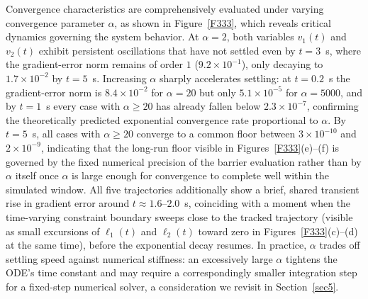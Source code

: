 \documentclass[pdflatex,sn-mathphys,Numbered]{sn-jnl}
\theoremstyle{thmstyleone}
\theoremstyle{thmstyletwo}
\theoremstyle{thmstylethree}
\begin{document}
Convergence characteristics are comprehensively evaluated under varying convergence parameter $\alpha$, as shown in Figure~\ref{F333}, which reveals critical dynamics governing the system behavior. At $\alpha=2$, both variables $v_1(t)$ and $v_2(t)$ exhibit persistent oscillations that have not settled even by $t=3$~s, where the gradient-error norm remains of order $1$ ($9.2\times10^{-1}$), only decaying to $1.7\times10^{-2}$ by $t=5$~s. Increasing $\alpha$ sharply accelerates settling: at $t=0.2$~s the gradient-error norm is $8.4\times10^{-2}$ for $\alpha=20$ but only $5.1\times10^{-5}$ for $\alpha=5000$, and by $t=1$~s every case with $\alpha\geq20$ has already fallen below $2.3\times10^{-7}$, confirming the theoretically predicted exponential convergence rate proportional to $\alpha$. By $t=5$~s, all cases with $\alpha\geq20$ converge to a common floor between $3\times10^{-10}$ and $2\times10^{-9}$, indicating that the long-run floor visible in Figures~\ref{F333}(e)--(f) is governed by the fixed numerical precision of the barrier evaluation rather than by $\alpha$ itself once $\alpha$ is large enough for convergence to complete well within the simulated window. All five trajectories additionally show a brief, shared transient rise in gradient error around $t\approx1.6$--$2.0$~s, coinciding with a moment when the time-varying constraint boundary sweeps close to the tracked trajectory (visible as small excursions of $\ell_1(t)$ and $\ell_2(t)$ toward zero in Figures~\ref{F333}(c)--(d) at the same time), before the exponential decay resumes. In practice, $\alpha$ trades off settling speed against numerical stiffness: an excessively large $\alpha$ tightens the ODE's time constant and may require a correspondingly smaller integration step for a fixed-step numerical solver, a consideration we revisit in Section~\ref{sec5}.
\end{document}
